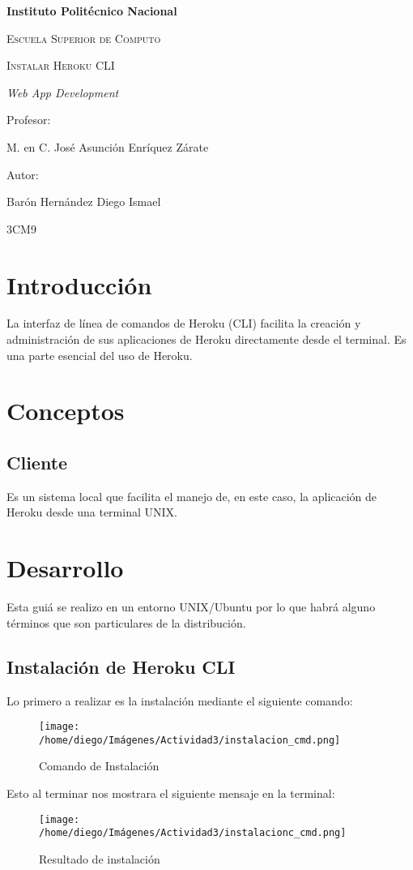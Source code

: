 \documentclass{article}
\begin{document}
	\begin{titlepage}
		\centering
		{\bfseries\LARGE Instituto Politécnico Nacional \par}
		\vspace{1cm}
		{\scshape\Large Escuela Superior de Computo \par}
		\vspace{3cm}
		{\scshape\Huge Instalar Heroku CLI \par}
		\vspace{3cm}
		{\itshape\Large Web App Development \par}
		\vfill
		{\Large Profesor: \par}
		{\Large M. en C. José Asunción Enríquez Zárate \par}
		\vspace{1cm}
		{\Large Autor: \par}
		{\Large Barón Hernández Diego Ismael \par}
		\vfill
		{\Large 3CM9 \par}
	\end{titlepage}
	\newpage
	\tableofcontents
	\newpage
	\section{Introducción}
		La interfaz de línea de comandos de Heroku (CLI) facilita la creación y administración de sus aplicaciones de Heroku directamente desde el terminal. Es una parte esencial del uso de Heroku.
	\section{Conceptos}
		\subsection{Cliente}
			Es un sistema local que facilita el manejo de, en este caso, la aplicación de Heroku desde una terminal UNIX.
	\section{Desarrollo}
		Esta guiá se realizo en un entorno UNIX/Ubuntu por lo que habrá alguno términos que son particulares de la distribución.
		\subsection{Instalación de Heroku CLI}
		Lo primero a realizar es la instalación mediante el siguiente comando:
		\begin{figure}[h]
			\centering
			\texttt{[image: /home/diego/Imágenes/Actividad3/instalacion\_cmd.png]}
			\caption{Comando de Instalación}
		\end{figure}
		Esto al terminar nos mostrara el siguiente mensaje en la terminal:
		\begin{figure}[h]
			\centering
			\texttt{[image: /home/diego/Imágenes/Actividad3/instalacionc\_cmd.png]}
			\caption{Resultado de instalación}
		\end{figure}
\end{document}
